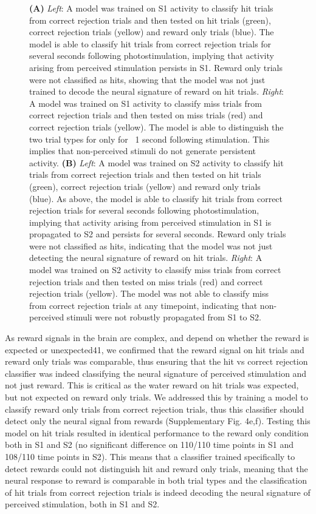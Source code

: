\begin{figure}[!h]
{\textbf{(A)} \textit{Left}: A model was trained on S1 activity to classify hit trials from correct rejection trials and then tested on hit trials (green), correct rejection trials (yellow) and reward only trials (blue). The model is able to classify hit trials from correct rejection trials for several seconds following photostimulation, implying that activity arising from perceived stimulation persists in S1. Reward only trials were not classified as hits, showing that the model was not just trained to decode the neural signature of reward on hit trials. \textit{Right}: A model was trained on S1 activity to classify miss trials from correct rejection trials and then tested on miss trials (red) and correct rejection trials (yellow). The model is able to distinguish the two trial types for only for ~1 second following stimulation. This implies that non-perceived stimuli do not generate persistent activity. \textbf{(B)} \textit{Left}: A model was trained on S2 activity to classify hit trials from correct rejection trials and then tested on hit trials (green), correct rejection trials (yellow) and reward only trials (blue). As above, the model is able to classify hit trials from correct rejection trials for several seconds following photostimulation, implying that activity arising from perceived stimulation in S1 is propagated to S2 and persists for several seconds. Reward only trials were not classified as hits, indicating that the model was not just detecting the neural signature of reward on hit trials. \textit{Right}: A model was trained on S2 activity to classify miss trials from correct rejection trials and then tested on miss trials (red) and correct rejection trials (yellow). The model was not able to classify miss from correct rejection trials at any timepoint, indicating that non-perceived stimuli were not robustly propagated from S1 to S2.
} 
\label{fig:fig3}
\end{figure}

As reward signals in the brain are complex, and depend on whether the reward is expected or unexpected41, we confirmed that the reward signal on hit trials and reward only trials was comparable, thus ensuring that the hit vs correct rejection classifier was indeed classifying the neural signature of perceived stimulation and not just reward. This is critical as the water reward on hit trials was expected, but not expected on reward only trials. We addressed this by training a model to classify reward only trials from correct rejection trials, thus this classifier should detect only the neural signal from rewards (Supplementary Fig. 4e,f). Testing this model on hit trials resulted in identical performance to the reward only condition both in S1 and S2 (no significant difference on 110/110 time points in S1 and 108/110 time points in S2). This means that a classifier trained specifically to detect rewards could not distinguish hit and reward only trials, meaning that the neural response to reward is comparable in both trial types and the classification of hit trials from correct rejection trials is indeed decoding the neural signature of perceived stimulation, both in S1 and S2.


